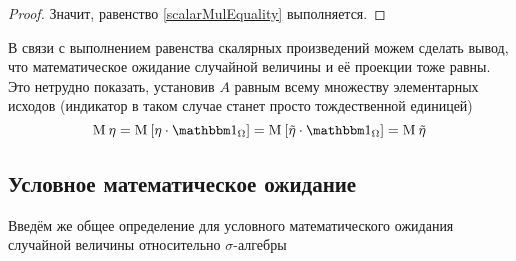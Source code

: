 \begin{proof}
\begin{comment}
Далее мы имеем полное математическое и моральное право
вынести $\eta$ за знак суммы.
Если с математикой всё очевидно (работает закон дистрибутивности),
то напомню о морально-этической стороне дела: нам нужно,
пройтись по всем возможным индикаторам $\indicatorof{H_k}$,
из которых лишь один сработает (будет равен единице, а не нулю),
поэтому сумма нужна лишь для того,
чтобы не писать в конце каждой строчки ``для тех $\omega$, что входят в $H_k$''
(помним, что случайная величина и индикатор --- функции
от элементарного события $\omega$)
$$\Mean{ \sum_{H_k \subseteq A} \eta \cdot \indicatorof{H_k} }
  = \Mean{\eta \left( \omega \right) \cdot \sum_{H_k \subseteq A}
      \indicatorof{H_k}\left( \omega \right)}$$

Сумма индикаторов непересекающихся событий --- индикатор их объединения,
которое является множеством $A$.
Не забываем, что оно может состоять из объединений уровней и только из них
(или же быть пустым)
$$\Mean{ \eta \cdot \sum_{H_k \subseteq A} \indicatorof{H_k} }
  = \Mean{ \eta \cdot \indicatorof{A} }$$
\end{comment}

Значит, равенство \eqref{scalarMulEquality} выполняется.
\end{proof}

\begin{remark}
  В связи с выполнением равенства скалярных произведений можем сделать вывод,
  что математическое ожидание случайной величины и её проекции тоже равны.
  Это нетрудно показать,
  установив $A$ равным всему множеству элементарных исходов
  (индикатор в таком случае станет просто тождественной единицей)
  $$\mean{\eta}
      = \Mean{ \eta \cdot \indicatorof{\Omega} }
      = \Mean{ \tilde{\eta} \cdot \indicatorof{\Omega} }
      = \mean{ \tilde{\eta} }$$
\end{remark}

\subsection{Условное математическое ожидание}
Введём же общее определение для условного математического ожидания
случайной величины относительно $\sigma$-алгебры

